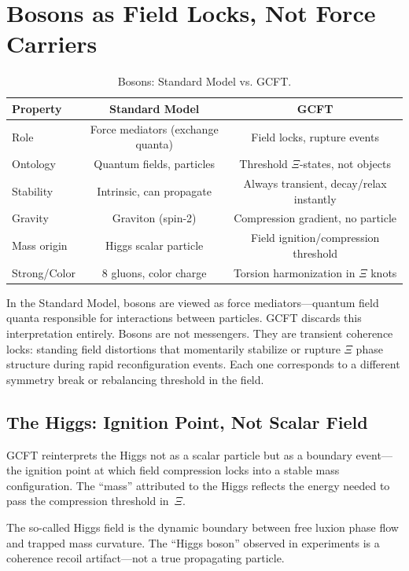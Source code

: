 \section{Bosons as Field Locks, Not Force Carriers}

\begin{table}[ht]
\centering
\begin{tabular}{lcc}
\hline
\textbf{Property} & \textbf{Standard Model} & \textbf{GCFT} \\
\hline
Role      & Force mediators (exchange quanta)     & Field locks, rupture events    \\
Ontology  & Quantum fields, particles             & Threshold $\Xi$-states, not objects \\
Stability & Intrinsic, can propagate              & Always transient, decay/relax instantly \\
Gravity   & Graviton (spin-2)                     & Compression gradient, no particle \\
Mass origin & Higgs scalar particle               & Field ignition/compression threshold \\
Strong/Color & 8 gluons, color charge             & Torsion harmonization in $\Xi$ knots \\
\hline
\end{tabular}
\caption{Bosons: Standard Model vs. GCFT.}
\label{tab:boson_gcft_compare}
\end{table}

In the Standard Model, bosons are viewed as force mediators—quantum field quanta responsible for interactions between particles. GCFT discards this interpretation entirely. Bosons are not messengers. They are transient coherence locks: standing field distortions that momentarily stabilize or rupture $\Xi$ phase structure during rapid reconfiguration events. Each one corresponds to a different symmetry break or rebalancing threshold in the field.

\subsection{The Higgs: Ignition Point, Not Scalar Field}

GCFT reinterprets the Higgs not as a scalar particle but as a boundary event—the ignition point at which field compression locks into a stable mass configuration. The ``mass'' attributed to the Higgs reflects the energy needed to pass the compression threshold in~$\Xi$.

The so-called Higgs field is the dynamic boundary between free luxion phase flow and trapped mass curvature. The ``Higgs boson'' observed in experiments is a coherence recoil artifact—not a true propagating particle.

